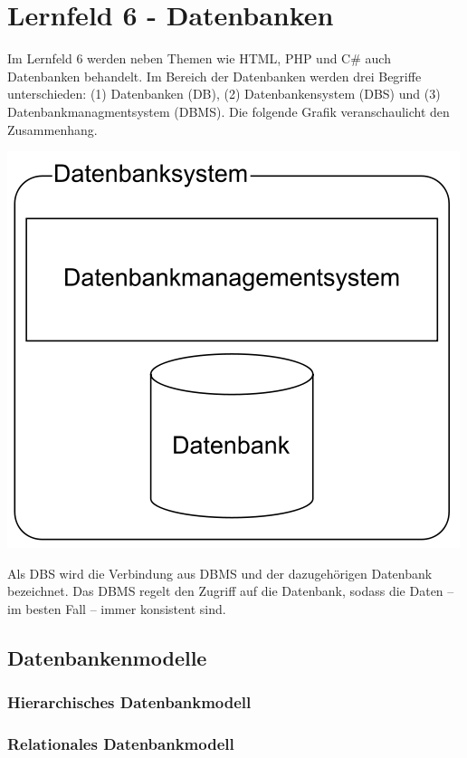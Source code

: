 \section{Lernfeld 6 - Datenbanken}

Im Lernfeld 6 werden neben Themen wie HTML, PHP und C# auch Datenbanken behandelt. Im Bereich der Datenbanken werden drei Begriffe unterschieden: (1) Datenbanken (DB), (2) Datenbankensystem (DBS) und (3) Datenbankmanagmentsystem (DBMS). Die folgende Grafik veranschaulicht den Zusammenhang.

\includegraphics[scale=0.4]{pictures/lf06-pic/lf06-begriffszusammenhang.png}

Als DBS wird die Verbindung aus DBMS und der dazugehörigen Datenbank bezeichnet. Das DBMS regelt den Zugriff auf die Datenbank, sodass die Daten -- im besten Fall -- immer konsistent sind. 

\subsection{Datenbankenmodelle}

\subsubsection{Hierarchisches Datenbankmodell}
\subsubsection{Relationales Datenbankmodell}
